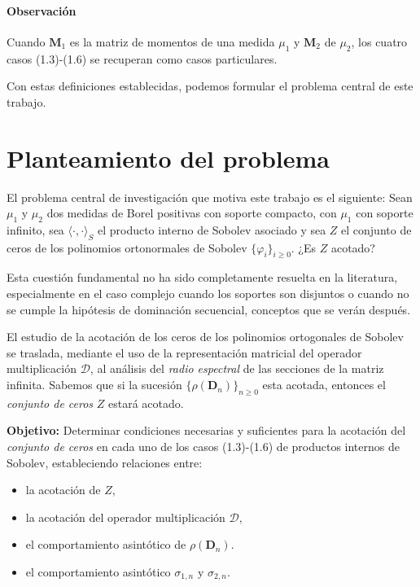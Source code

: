\paragraph{Observación}
Cuando \(\mathbf{M}_{1}\) es la matriz de momentos de una medida \(\mu_{1}\) y
\(\mathbf{M}_{2}\) de \(\mu_{2}\), los cuatro casos (1.3)-(1.6) se recuperan como casos particulares.

Con estas definiciones establecidas, podemos formular el problema central de este trabajo.

\section{Planteamiento del problema}

El problema central de investigación que motiva este trabajo es el siguiente: Sean $\mu_1$ y $\mu_2$ dos medidas de Borel positivas con soporte compacto, con $\mu_1$ con soporte infinito, sea $\langle\cdot,\cdot\rangle_S$ el producto interno de Sobolev asociado y sea $Z$ el conjunto de ceros de los polinomios ortonormales de Sobolev $\{\varphi_i\}_{i\ge 0}$. ¿Es $Z$ acotado?

Esta cuestión fundamental no ha sido completamente resuelta en la literatura, especialmente en el caso complejo cuando los soportes son disjuntos o cuando no se cumple la hipótesis de dominación secuencial, conceptos que se verán después.

El estudio de la acotación de los ceros de los polinomios ortogonales de Sobolev se
traslada, mediante el uso de la representación matricial del
operador multiplicación $\mathcal{D}$, al análisis del \emph{radio espectral} de las secciones de la matriz infinita. Sabemos que si la sucesión \(\{\rho(\mathbf{D}_{n})\}_{n\ge0}\) esta acotada, entonces el \emph{conjunto de ceros}
\(Z\) estará acotado.

\textbf{Objetivo: }
Determinar condiciones necesarias y suficientes para la acotación del \emph{conjunto de ceros} en cada uno de los casos (1.3)-(1.6) de productos internos de Sobolev, estableciendo relaciones entre:
\begin{itemize}
  \item la acotación de $Z$,
  \item la acotación del operador multiplicación $\mathcal{D}$,
  \item el comportamiento asintótico de $\rho(\mathbf{D}_{n})$.
  \item el comportamiento asintótico $\sigma_{1,n}$ y $\sigma_{2,n}$.
\end{itemize}

